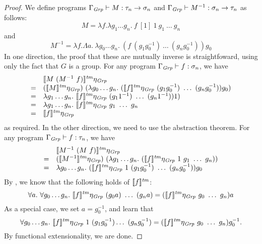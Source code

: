 \begin{proof}
  We define programs $\Gamma_{\mathit{Grp}} \vdash M : \tau_n \to \sigma_n$ and
  $\Gamma_{\mathit{Grp}} \vdash M^{-1} : \sigma_n \to \tau_n$ as follows:
  \begin{displaymath}
    M = \lambda f. \lambda g_1 \dots g_n.\ f\ [1]\ 1\ g_1\ \dots\ g_n
  \end{displaymath}
  and
  \begin{displaymath}
    M^{-1} = \lambda f. \Lambda a.\ \lambda g_0 \dots g_n.\ (f\ (g_1 g^{-1}_0)\ \dots\ (g_n g^{-1}_0)) g_0
  \end{displaymath}
  In one direction, the proof that these are mutually inverse is
  straightfoward, using only the fact that $G$ is a group. For any
  program $\Gamma_{\mathit{Grp}} \vdash f : \sigma_n$, we have
  \begin{displaymath}
    \begin{array}{cl}
        & \tmSem{M\ (M^{-1}\ f)}\eta_\Grp \\
      = & (\tmSem{M}\eta_{\Grp})\ (\lambda g_0 \dots g_n.\ (\tmSem{f}\eta_\Grp\ (g_1 g^{-1}_0)\ \dots\ (g_n g^{-1}_0)) g_0) \\
      = & \lambda g_1\dots g_n.\ \tmSem{f}\eta_\Grp\ (g_1 1^{-1})\ \dots\ (g_n 1^{-1})) 1) \\
      = & \lambda g_1\dots g_n.\ \tmSem{f}\eta_\Grp\ g_1\ \dots\ g_n \\
      = & \tmSem{f}\eta_\Grp
    \end{array}
  \end{displaymath}
  as required. In the other direction, we need to use the abstraction
  theorem. For any program $\Gamma_{\mathit{Grp}} \vdash f : \tau_n$, we have
  \begin{displaymath}
    \begin{array}{cl}
        & \tmSem{M^{-1}\ (M\ f)}\eta_\Grp \\
      = & (\tmSem{M^{-1}}\eta_\Grp)\ (\lambda g_1\dots g_n.\ (\tmSem{f}\eta_\Grp\ 1\ g_1\ \dots\ g_n)) \\
      = & \lambda g_0\dots g_n.\ (\tmSem{f}\eta_\Grp\ 1\ (g_1g^{-1}_0)\ \dots\ (g_ng^{-1}_0))g_0
    \end{array}
  \end{displaymath}
  By , we know that the following holds of
  $\llbracket f \rrbracket^{\mathit{tm}}$:
  \begin{displaymath}
    \forall a.\ \forall g_0 \dots g_n.\ \tmSem{f}\eta_\Grp\ (g_0a)\ \dots\ (g_na) = (\tmSem{f}\eta_\Grp\ g_0\ \dots\ g_n)a
  \end{displaymath}
  As a special case, we set $a = g^{-1}_0$, and learn that
  \begin{displaymath}
    \forall g_0 \dots g_n.\ \tmSem{f}\eta_\Grp\ 1\ (g_1g^{-1}_0) \dots\ (g_ng^{-1}_0) = (\tmSem{f}\eta_\Grp\ g_0\ \dots\ g_n)g^{-1}_0.
  \end{displaymath}
  By functional extensionality, we are done.
\end{proof}


